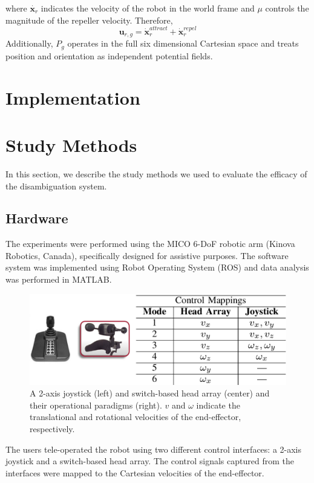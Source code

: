 where $\dot{\boldsymbol{x}_r}$ indicates the velocity of the robot in the world frame and $\mu$ controls the magnitude of the repeller velocity. Therefore, 
\begin{equation*}
\boldsymbol{u}_{r,g} = \dot{\boldsymbol{x}}_r^{attract} + \dot{\boldsymbol{x}}_r^{repel} 
\end{equation*}
Additionally, $P_g$ operates in the full six dimensional Cartesian space and treats position and orientation as independent potential fields. 
%
%
%

\section{Implementation}\label{sec:implementation}

\section{Study Methods}\label{sec:ed}
In this section, we describe the study methods we used to evaluate the efficacy of the disambiguation system. 
\subsection{Hardware}\label{ssec:hardware}
The experiments were performed using the MICO 6-DoF robotic arm (Kinova Robotics, Canada), specifically designed for assistive purposes. The software system was implemented using Robot Operating System (ROS) and data analysis was performed in MATLAB. 
\begin{figure}[h]
	\centering
	\includegraphics[width = 1\hsize, height = 0.14\vsize]{./figures/INTER_4.eps}
	\caption{A 2-axis joystick (left) and switch-based head array (center) and their operational paradigms (right). $v$ and $\omega$ indicate the translational and rotational velocities of the end-effector, respectively.}
	\label{fig:interfaces}
\end{figure}
The users tele-operated the robot using two different control interfaces: a 2-axis joystick and a switch-based head array. The control signals captured from the interfaces were mapped to the Cartesian velocities of the end-effector.


